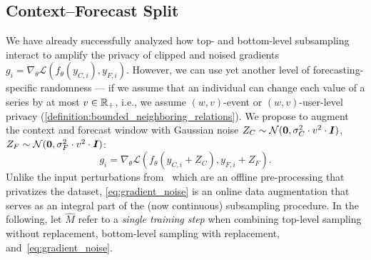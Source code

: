 \subsection{Context--Forecast Split}\label{section:context_forecast_structure}
We have already successfully analyzed how top- and bottom-level subsampling interact to amplify  the privacy of clipped and noised gradients $g_i = \nabla_\theta \mathcal{L}(f_\theta(y_{C,i}), y_{F,i})$. 
However, we can use yet another level of forecasting-specific 
randomness  --- if we assume that an individual can change each value of a series by at most $v \in {\mathbb{R}}_+$, i.e., we assume 
$(w,v)$-event or $(w,v)$-user-level privacy (\cref{definition:bounded_neighboring_relations}). 
We propose to augment the context and forecast window with Gaussian noise
$Z_C \sim \mathcal{N}({\bm{0}}, \sigma_C ^2 \cdot v^2 \cdot  {\bm{I}})$, $Z_F \sim \mathcal{N}({\bm{0}}, \sigma_F ^2 \cdot v^2 \cdot  {\bm{I}})$:
\begin{equation}\label{eq:gradient_noise}
    g_i = \nabla_\theta \mathcal{L}(f_\theta(y_{C,i} + Z_C), y_{F,i}+ Z_F).
\end{equation}
Unlike the input perturbations from~\cite{arcolezi2022differentially} which are an offline pre-processing that privatizes the dataset, 
\cref{eq:gradient_noise} is an online data augmentation that serves as an integral part of the (now continuous) subsampling procedure.
In the following, let $\hat{M}$ refer to a \emph{single training step} when combining top-level sampling without replacement, bottom-level sampling with replacement, and~\cref{eq:gradient_noise}.


